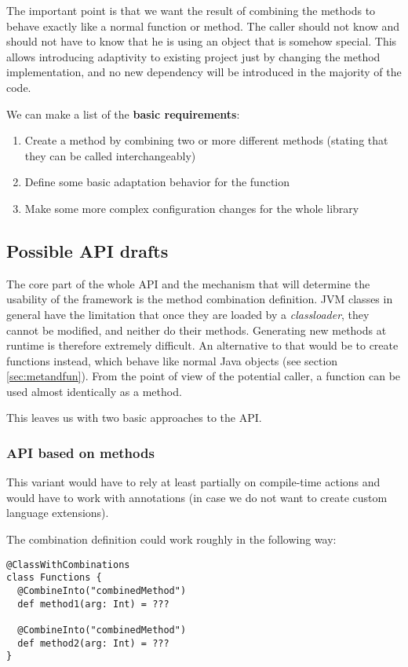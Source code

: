 The important point is that we want the result of combining the methods to behave exactly like a normal function or method. The caller should not know and should not have to know that he is using an object that is somehow special. This allows introducing adaptivity to existing project just by changing the method implementation, and no new dependency will be introduced in the majority of the code.

We can make a list of the \textbf{basic requirements}:
\begin{enumerate}
	\item Create a method by combining two or more different methods (stating that they can be called interchangeably)
	\item Define some basic adaptation behavior for the function
	\item Make some more complex configuration changes for the whole library
\end{enumerate}

\subsection{Possible API drafts}
\label{subsec:api_drafts}

The core part of the whole API and the mechanism that will determine the usability of the framework is the method combination definition. JVM classes in general have the limitation that once they are loaded by a \textit{classloader}, they cannot be modified, and neither do their methods. Generating new methods at runtime is therefore extremely difficult. An alternative to that would be to create functions instead, which behave like normal Java objects (see section \ref{sec:metandfun}). From the point of view of the potential caller, a function can be used almost identically as a method. 

This leaves us with two basic approaches to the API.

\subsubsection{API based on methods}

This variant would have to rely at least partially on compile-time actions and would have to work with annotations (in case we do not want to create custom language extensions).

The combination definition could work roughly in the following way:
\lstset{style=Scala}
\begin{lstlisting}
@ClassWithCombinations
class Functions {
  @CombineInto("combinedMethod")
  def method1(arg: Int) = ???
  
  @CombineInto("combinedMethod")
  def method2(arg: Int) = ???
}
\end{lstlisting}

